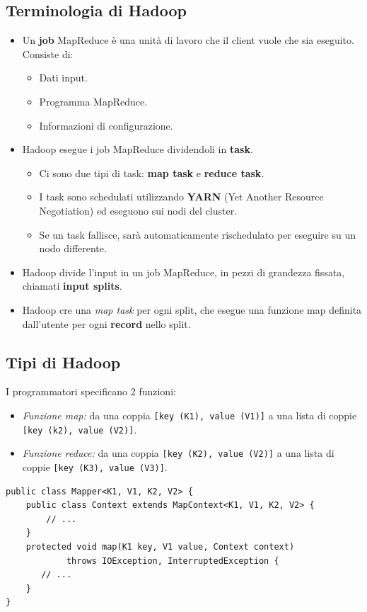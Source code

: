\documentclass{article}
\begin{document}
\begin{appendices}
\subsection{Terminologia di Hadoop}
\begin{itemize}
    \item Un \textbf{job} MapReduce è una unità di lavoro che il client vuole che sia eseguito. Consiste di:
    \begin{itemize}
        \item Dati input.
        \item Programma MapReduce.
        \item Informazioni di configurazione.
    \end{itemize}
    \item Hadoop esegue i job MapReduce dividendoli in \textbf{task}.
    \begin{itemize}
        \item Ci sono due tipi di task: \textbf{map task} e \textbf{reduce task}.
        \item I task sono schedulati utilizzando \textbf{YARN} (Yet Another Resource Negotiation) ed eseguono sui nodi del cluster.
        \item Se un task fallisce, sarà automaticamente rischedulato per eseguire su un nodo differente.
    \end{itemize}
    \item Hadoop divide l'input in un job MapReduce, in pezzi di grandezza fissata, chiamati \textbf{input splits}.
    \item Hadoop cre una \textit{map task} per ogni split, che esegue una funzione map definita dall'utente per ogni \textbf{record} nello split.
\end{itemize}

\subsection{Tipi di Hadoop}
I programmatori specificano 2 funzioni:
\begin{itemize}
    \item \textit{Funzione map:} da una coppia \texttt{[key (K1), value (V1)]} a una lista di coppie \texttt{[key (k2), value (V2)]}.
    \item \textit{Funzione reduce:} da una coppia \texttt{[key (K2), value (V2)]} a una lista di coppie \texttt{[key (K3), value (V3)]}.
\end{itemize}
\begin{lstlisting}
public class Mapper<K1, V1, K2, V2> {
    public class Context extends MapContext<K1, V1, K2, V2> {
        // ...
    }
    protected void map(K1 key, V1 value, Context context) 
            throws IOException, InterruptedException {
       // ...
    }
}


\end{lstlisting}
\end{appendices}
\end{document}
